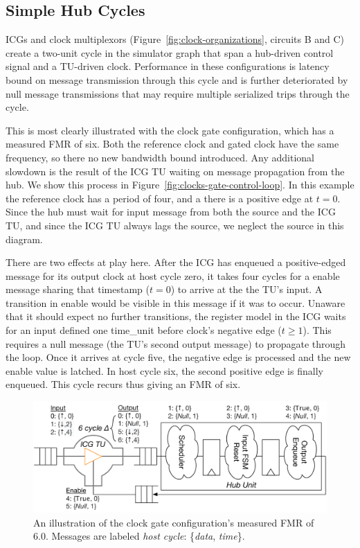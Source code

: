 \subsection{Simple Hub Cycles}
ICGs and clock multiplexors (Figure~\ref{fig:clock-organizations}, circuits B
and C) create a two-unit cycle in the simulator graph that span a hub-driven
control signal and a TU-driven clock. Performance in these configurations is
latency bound on message transmission through this cycle and is further
deteriorated by null message transmissions that may require multiple serialized
trips through the cycle.

This is most clearly illustrated with the clock gate configuration, which has a
measured FMR of six. Both the reference clock and gated clock have the same
frequency, so there no new bandwidth bound introduced. Any additional slowdown is the
result of the ICG TU waiting on message propagation from the hub. We show this
process in Figure~\ref{fig:clocks-gate-control-loop}. In this example the reference clock
has a period of four, and a there is a positive edge at $t = 0$. Since the hub
must wait for input message from both the source and the ICG TU, and since the
ICG TU always lags the source, we neglect the source in this diagram.

There are two effects at play here. After the ICG has enqueued a positive-edged
message for its output clock at host cycle zero, it takes four cycles for a
enable message sharing that timestamp ($t = 0$) to arrive at the the TU's
input. A transition in enable would be visible in this message if it was to
occur. Unaware that it should expect no further transitions, the register model
in the ICG waits for an input defined one time\_unit before clock's negative
edge ($t \geq 1$). This requires a null message (the TU's second output
message) to propagate through the loop. Once it arrives at cycle five, the
negative edge is processed and the new enable value is latched. In host cycle
six, the second positive edge is finally enqueued. This cycle recurs thus
giving an FMR of six.

\begin{figure}
    \centering
    \captionsetup{margin=0.25cm}
    \includegraphics[width=\columnwidth]{figures/clock-gate-control-loop.pdf}
    \caption{An illustration of the clock gate configuration's measured FMR of 6.0. Messages are labeled
    \emph{host cycle}: \{\emph{data}, \emph{time}\}.}
    \label{fig:clock-gate-control-loop}
\end{figure}

